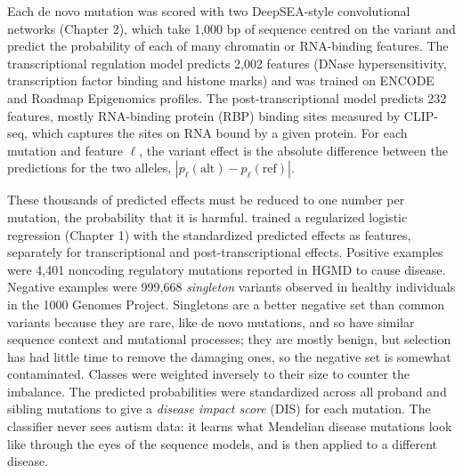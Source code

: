 Each de novo mutation was scored with two DeepSEA-style convolutional networks (Chapter 2), which take 1,000 bp of sequence centred on the variant and predict the probability of each of many chromatin or RNA-binding features. The transcriptional regulation model predicts 2,002 features (DNase hypersensitivity, transcription factor binding and histone marks) and was trained on ENCODE and Roadmap Epigenomics profiles. The post-transcriptional model predicts 232 features, mostly RNA-binding protein (RBP) binding sites measured by CLIP-seq, which captures the sites on RNA bound by a given protein. For each mutation and feature $\ell$, the variant effect is the absolute difference between the predictions for the two alleles, $|p_\ell(\text{alt})-p_\ell(\text{ref})|$.

These thousands of predicted effects must be reduced to one number per mutation, the probability that it is harmful. \citet{zhou2019} trained a regularized logistic regression (Chapter 1) with the standardized predicted effects as features, separately for transcriptional and post-transcriptional effects. Positive examples were 4,401 noncoding regulatory mutations reported in HGMD to cause disease. Negative examples were 999,668 \emph{singleton} variants observed in healthy individuals in the 1000 Genomes Project. Singletons are a better negative set than common variants because they are rare, like de novo mutations, and so have similar sequence context and mutational processes; they are mostly benign, but selection has had little time to remove the damaging ones, so the negative set is somewhat contaminated. Classes were weighted inversely to their size to counter the imbalance. The predicted probabilities were standardized across all proband and sibling mutations to give a \emph{disease impact score} (DIS) for each mutation. The classifier never sees autism data: it learns what Mendelian disease mutations look like through the eyes of the sequence models, and is then applied to a different disease.

